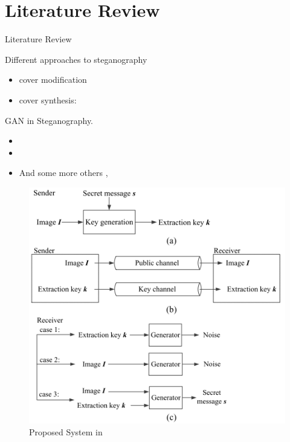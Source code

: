 \documentclass[11pt]{beamer}
\begin{document}
\section{Literature Review}
\begin{frame}{Literature Review} %


Different approaches to steganography
\begin{itemize}
	\item cover modification 
	\item cover synthesis: 
\end{itemize}

\end{frame}

\begin{frame} %

GAN in Steganography.
\begin{itemize}
	\item <1-> 
	\item <2-> 
	\item <3-> And some more others ,
\end{itemize}
\end{frame}

\begin{frame} %
	
	\begin{figure}
		\includegraphics[scale=0.5]{../images/Ke}
		\caption{Proposed System in }
	\end{figure}
\end{frame}
\end{document}
